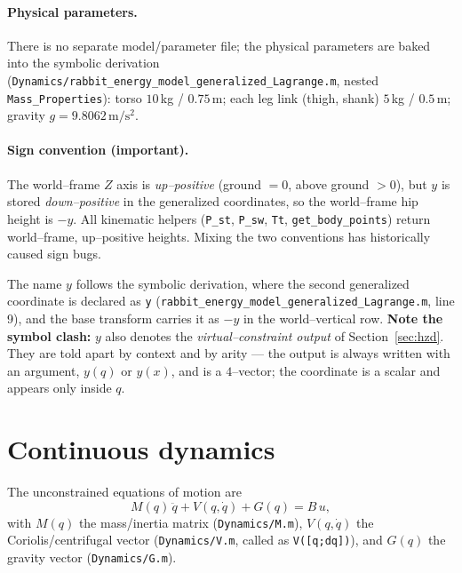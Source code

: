\documentclass[11pt,a4paper]{article}
\newcommand{\code}[1]{\texttt{#1}}          %
\newcommand{\fname}[1]{\texttt{#1}}          %
\newcommand{\warn}[1]{\textcolor{red!70!black}{\textbf{#1}}}
\begin{document}
\paragraph{Physical parameters.}
There is no separate model/parameter file; the physical parameters are baked
into the symbolic derivation
(\fname{Dynamics/rabbit\_energy\_model\_generalized\_Lagrange.m}, nested
\code{Mass\_Properties}): torso $10\,$kg / $0.75\,$m; each leg link (thigh,
shank) $5\,$kg / $0.5\,$m; gravity $g = 9.8062\,\mathrm{m/s^2}$.

\paragraph{Sign convention (important).}
The world--frame $Z$ axis is \emph{up--positive} (ground $=0$, above ground
$>0$), but $y$ is stored \emph{down--positive} in the generalized
coordinates, so the world--frame hip height is $-y$. All kinematic helpers
(\code{P\_st}, \code{P\_sw}, \code{Tt}, \code{get\_body\_points}) return
world--frame, up--positive heights. Mixing the two conventions has historically
caused sign bugs.

The name $y$ follows the symbolic derivation, where the second generalized
coordinate is declared as \code{y}
(\fname{rabbit\_energy\_model\_generalized\_Lagrange.m}, line 9), and the base
transform carries it as $-y$ in the world--vertical row. \warn{Note the symbol
clash:} $y$ also denotes the \emph{virtual--constraint output} of
Section~\ref{sec:hzd}. They are told apart by context and by arity --- the
output is always written with an argument, $y(q)$ or $y(x)$, and is a
$4$--vector; the coordinate is a scalar and appears only inside $q$.

\section{Continuous dynamics}
The unconstrained equations of motion are
\begin{equation}
  M(q)\,\ddot q + V(q,\dot q) + G(q) = B\,u,
  \label{eq:eom}
\end{equation}
with $M(q)$ the mass/inertia matrix (\fname{Dynamics/M.m}), $V(q,\dot q)$ the
Coriolis/centrifugal vector (\fname{Dynamics/V.m}, called as
\code{V([q;dq])}), and $G(q)$ the gravity vector (\fname{Dynamics/G.m}).
\end{document}
